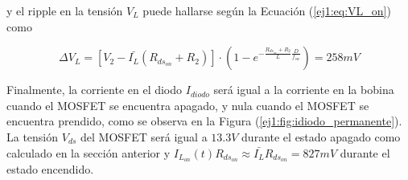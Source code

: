 y el ripple en la tensión $V_L$ puede hallarse según la Ecuación (\ref{ej1:eq:VL_on}) como

\begin{equation}
\Delta V_L = \left[ V_2 - \bar{I_L} (R_{ds_{on}}+R_2) \right] \cdot (1-e^{-\frac{R_{ds_{on}} + R_2}{L}\frac{D}{f_{sw}}}) = 258mV
\end{equation}

Finalmente, la corriente en el diodo $I_{diodo}$ será igual a la corriente en la bobina cuando el MOSFET se encuentra apagado, y nula cuando el MOSFET se encuentra prendido, como se observa en la Figura (\ref{ej1:fig:idiodo_permanente}). La tensión $V_{ds}$ del MOSFET será igual a $13.3V$ durante el estado apagado como calculado en la sección anterior y $I_{L_{on}}(t)R_{ds_{on}} \approx \bar{I_L}R_{ds_{on}} = 827mV$ durante el estado encendido.

